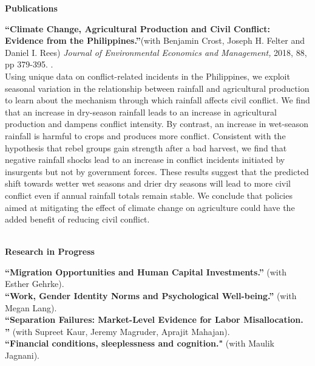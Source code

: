 \documentclass[10pt, oneside]{article}
\begin{document}
\begin{minipage}[t]{0.1\linewidth}
\textbf{Publications}
\end{minipage}\hspace{0.05\linewidth}
\begin{minipage}[t]{0.8\linewidth}
\textbf{``Climate Change, Agricultural Production and Civil Conflict: Evidence from the Philippines.''}(with Benjamin Crost, Joseph H. Felter and Daniel I. Rees) \emph{Journal of Environmental Economics and Management,} 2018, 88, pp 379-395. \href{http://claireduq.github.io/Climatephilippines.pdf}{\color{blue}{Available here}}. \\
Using unique data on conflict-related incidents in the Philippines, we exploit seasonal variation in the relationship between rainfall and agricultural production to learn about the mechanism through which rainfall affects civil conflict. We find that an increase in dry-season rainfall leads to an increase in agricultural production and dampens conflict intensity. By contrast, an increase in wet-season rainfall is harmful to crops and produces more conflict. Consistent with the hypothesis that rebel groups gain strength after a bad harvest, we find that negative rainfall shocks lead to an increase in conflict incidents initiated by insurgents but not by government forces. These results suggest that the predicted shift towards wetter wet seasons and drier dry seasons will lead to more civil conflict even if annual rainfall totals remain stable. We conclude that policies aimed at mitigating the effect of climate change on agriculture could have the added benefit of reducing civil conflict.\\~\\
\end{minipage}\vspace{4mm}




\begin{minipage}[t]{0.1\linewidth}
\textbf{Research in Progress}
\end{minipage}\hspace{0.05\linewidth}
\begin{minipage}[t]{0.8\linewidth}
\textbf{``Migration Opportunities and Human Capital Investments.''} (with Esther Gehrke). \\ 
\textbf{``Work, Gender Identity Norms and Psychological Well-being.''} (with Megan Lang). \\
\textbf{``Separation Failures: Market-Level Evidence for Labor Misallocation. ''} (with Supreet Kaur, Jeremy Magruder, Aprajit Mahajan). \\
\textbf{``Financial conditions, sleeplessness and cognition."} (with Maulik Jagnani). 
\end{minipage}\vspace{4mm} 
\end{document}
